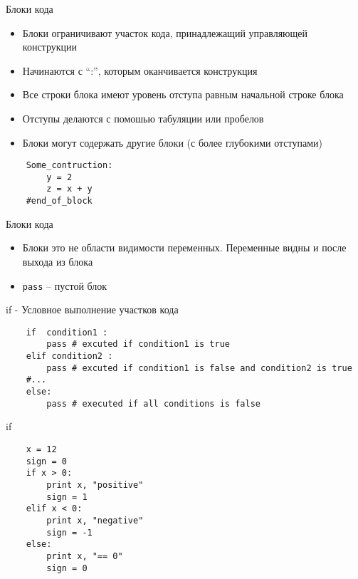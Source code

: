 \documentclass{article}
\begin{document}
\LARGE

\begin{center} Блоки кода \end{center}
\begin{itemize}
	\item Блоки ограничивают участок кода, принадлежащий управляющей конструкции
	\item Начинаются с “:”, которым оканчивается конструкция 
	\item Все строки блока имеют уровень отступа равным начальной строке блока
	\item Отступы делаются с помошью табуляции или пробелов
	\item Блоки могут содержать другие блоки (с более глубокими отступами)
\end{itemize}
\vspace{15pt}
\begin{lstlisting}
	Some_contruction:
		y = 2
		z = x + y
	#end_of_block
\end{lstlisting}
\newpage

\begin{center} Блоки кода \end{center}
\begin{itemize}
	\item Блоки это не области видимости переменных. Переменные видны и после выхода из блока
	\item \lstinline$pass$ – пустой блок
\end{itemize}
\newpage

\begin{center} if - Условное выполнение участков кода \end{center}
\vspace{15pt}
\begin{lstlisting}
	if  condition1 :
	    pass # excuted if condition1 is true
	elif condition2 :
	    pass # excuted if condition1 is false and condition2 is true
	#... 
	else:
	    pass # executed if all conditions is false 
\end{lstlisting}
\newpage

\begin{center} if \end{center}
\vspace{15pt}
\begin{lstlisting}
	x = 12
	sign = 0
	if x > 0:
	    print x, "positive"
	    sign = 1
	elif x < 0:
	    print x, "negative"
	    sign = -1
	else:
	    print x, "== 0"
	    sign = 0
\end{lstlisting}
\newpage
\end{document}
